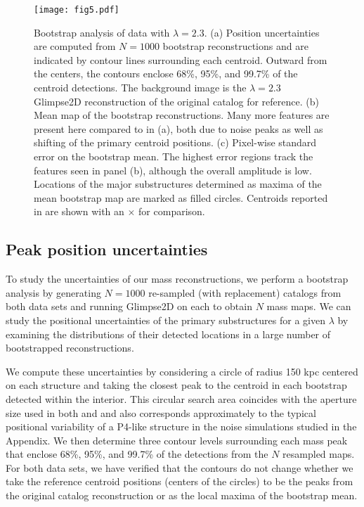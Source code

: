 \documentclass[iop,twocolappendix]{emulateapj}
\newcommand{\cta}[1]{\citetalias{#1}}
\begin{document}
\begin{figure*}
\centering
\texttt{[image: fig5.pdf]}
\caption{Bootstrap analysis of \cta{C12} data with $\lambda=2.3$. (a) Position uncertainties are computed
         from $N=1000$ bootstrap reconstructions and are indicated by contour lines surrounding each 
         centroid. Outward from the centers, the contours enclose 68\%, 95\%, and 99.7\% of the centroid
         detections. The background image is the $\lambda=2.3$ Glimpse2D reconstruction of the original
         catalog for reference. (b) Mean map of the bootstrap reconstructions. Many more features are
         present here compared to in (a), both due to noise peaks as well as shifting of the primary
         centroid positions. (c) Pixel-wise standard error on the bootstrap mean. The highest
         error regions track the features seen in panel (b), although the overall amplitude is low.
         Locations of the major substructures determined as maxima of the mean bootstrap map are marked
         as filled circles. Centroids reported in \cta{C12} are shown with an $\times$ for comparison.}
\label{fig:C12bootstraps}
\end{figure*}

\subsection{Peak position uncertainties}\label{ssec:bootstrap}
To study the uncertainties of our mass reconstructions, we perform a bootstrap analysis by 
generating $N=1000$ re-sampled (with replacement) catalogs from both data sets and running 
Glimpse2D on each to obtain $N$ mass maps.
We can study the positional uncertainties of the primary substructures for a given $\lambda$ 
by examining the distributions of their detected locations in a large number of bootstrapped
reconstructions. 

We compute these uncertainties by considering a circle of radius 150 kpc centered on each structure
and taking the closest peak to the centroid in each bootstrap detected within the interior. 
This circular search area coincides with the aperture size used in both \cta{C12} and \cta{J14} 
and also corresponds approximately to the typical positional variability of a P4-like structure 
in the noise simulations studied in the Appendix.
We then determine three contour levels surrounding each mass peak that enclose 68\%, 95\%, and 
99.7\% of the detections from the $N$ resampled maps. For both data sets, we have verified that 
the contours do not change whether we take the reference centroid positions (centers of the 
circles) to be the peaks from the original catalog reconstruction or as the local maxima of the 
bootstrap mean. 
\end{document}
